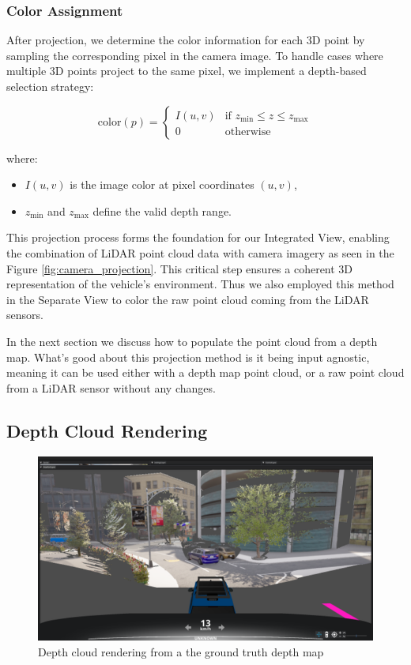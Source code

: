 \subsubsection{Color Assignment}

After projection, we determine the color information for each 3D point by sampling the corresponding pixel in the camera image. To handle cases where multiple 3D points project to the same pixel, we implement a depth-based selection strategy:

\[
\text{color}(p) =
\begin{cases}
I(u,v) & \text{if } z_{\min} \leq z \leq z_{\max} \\
0 & \text{otherwise}
\end{cases}
\]

where:
\begin{itemize}
    \item \( I(u,v) \) is the image color at pixel coordinates \( (u,v) \),
    \item \( z_{\min} \) and \( z_{\max} \) define the valid depth range.
\end{itemize}

This projection process forms the foundation for our Integrated View,
enabling the combination of \ac{LiDAR} point cloud data with camera imagery as seen in the Figure \ref{fig:camera_projection}.
This critical step ensures a coherent 3D representation of the vehicle's environment.
Thus we also employed this method in the Separate View to color the raw point cloud
coming from the \ac{LiDAR} sensors.

In the next section we discuss how to populate the point cloud from a depth map. What's good about this
projection method is it being input agnostic, meaning it can be used either with a depth map point cloud,
or a raw point cloud from a \ac{LiDAR} sensor without any changes.

\subsection{Depth Cloud Rendering}

\begin{figure}
    \centering
    \includegraphics[width=\textwidth, trim=0 150pt 0 50pt, clip]{figures/gt.png}
    \caption{Depth cloud rendering from a the ground truth depth map}
    \label{fig:depth_cloud}
\end{figure}

